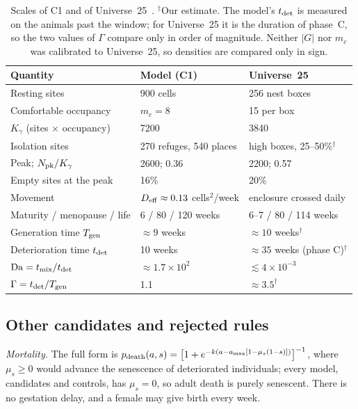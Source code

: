 \begin{table}[t]
  \caption{Scales of \textsf{C1} and of Universe~25~\cite{Calhoun1973}. $^\dagger$Our estimate. The model's
  $t_{\rm det}$ is measured on the animals past the window; for Universe~25 it is the duration of phase~C, so the two
  values of $\Gamma$ compare only in order of magnitude. Neither $|G|$ nor $m_c$ was calibrated to Universe~25, so
  densities are compared only in sign.}
  \label{tab:sm-model-scales}
  \begin{ruledtabular}
  \begin{tabular}{lll}
    Quantity & Model (\textsf{C1}) & Universe~25 \\
    \hline
    Resting sites & 900 cells & 256 nest boxes \\
    Comfortable occupancy & $m_c=8$ & 15 per box \\
    $K_\gamma$ (sites $\times$ occupancy) & 7200 & 3840 \\
    Isolation sites & 270 refuges, 540 places & high boxes, 25--50\%$^\dagger$ \\
    Peak; $N_{\rm pk}/K_\gamma$ & 2600; 0.36 & 2200; 0.57 \\
    Empty sites at the peak & 16\% & 20\% \\
    Movement & $D_{\rm eff}\approx0.13$ cells$^2$/week & enclosure crossed daily \\
    Maturity / menopause / life & 6 / 80 / 120 weeks & 6--7 / 80 / 114 weeks \\
    Generation time $T_{\rm gen}$ & $\approx9$ weeks & $\approx10$ weeks$^\dagger$ \\
    Deterioration time $t_{\rm det}$ & 10 weeks & $\approx35$ weeks (phase C)$^\dagger$ \\
    $\mathrm{Da}=t_{\rm mix}/t_{\rm det}$ & $\approx1.7\times10^2$ & $\lesssim4\times10^{-3}$ \\
    $\Gamma=t_{\rm det}/T_{\rm gen}$ & 1.1 & $\approx3.5^\dagger$ \\
  \end{tabular}
  \end{ruledtabular}
\end{table}

\subsection{Other candidates and rejected rules}
\label{sm:model-other}

\emph{Mortality.} The full form is
$p_{\rm death}(a,s)=\bigl[1+e^{-k(a-a_{\max}[1-\mu_s(1-s)])}\bigr]^{-1}$, where $\mu_s\ge0$ would advance the
senescence of deteriorated individuals; every model, candidates and controls, has $\mu_s=0$, so adult death is purely
senescent. There is no gestation
delay, and a female may give birth every week.

